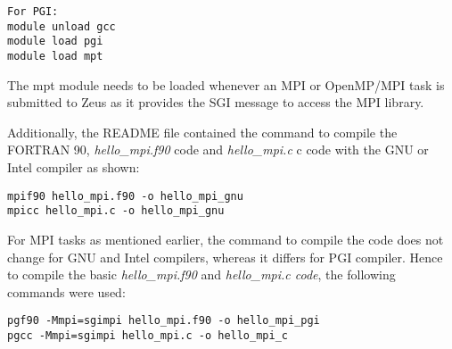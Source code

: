 \begin{tcolorbox}
\begin{Verbatim}[fontsize=\scriptsize]
For PGI:
module unload gcc
module load pgi
module load mpt
\end{Verbatim}
\end{tcolorbox}

The mpt module needs to be loaded whenever an MPI or OpenMP/MPI task is submitted to Zeus as it provides the SGI message to access the MPI library.

Additionally, the README file contained the command to compile the FORTRAN 90, \emph{hello\_mpi.f90} code and \emph{hello\_mpi.c} c code with the GNU or
Intel compiler as shown:

\begin{tcolorbox}
\begin{Verbatim}[fontsize=\scriptsize]
mpif90 hello_mpi.f90 -o hello_mpi_gnu
mpicc hello_mpi.c -o hello_mpi_gnu
\end{Verbatim}
\end{tcolorbox}

For MPI tasks as mentioned earlier, the command to compile the code does not change for GNU and Intel compilers, whereas it differs for PGI compiler.
Hence to compile the basic \emph{hello\_mpi.f90} and \emph{hello_mpi.c code}, the following commands were used:

\begin{tcolorbox}
\begin{Verbatim}[fontsize=\scriptsize]
pgf90 -Mmpi=sgimpi hello_mpi.f90 -o hello_mpi_pgi
pgcc -Mmpi=sgimpi hello_mpi.c -o hello_mpi_c 
\end{Verbatim}
\end{tcolorbox}
